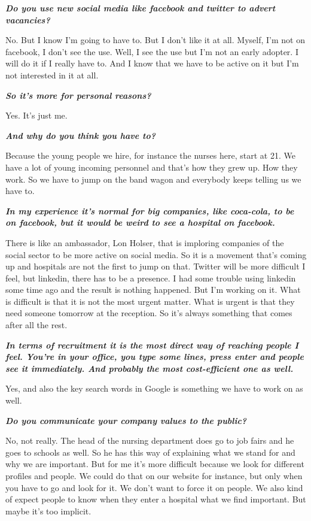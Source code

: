 \documentclass[a4paper,fleqn,11pt,dvips,titlepage]{article}
\newcommand{\question}[1]{\textbf{\textit{#1}}}
\numberwithin{figure}{section}
\numberwithin{equation}{section}
\begin{document}
\question{Do you use new social media like facebook and twitter to advert vacancies?}

No. But I know I’m going to have to. But I don’t like it at all. Myself, I’m not on facebook, I don’t see the use. Well, I see the use but I’m not an early adopter. I will do it if I really have to. And I know that we have to be active on it but I’m not interested in it at all. 

\question{So it’s more for personal reasons?}

Yes. It’s just me. 

\question{And why do you think you have to?}

Because the young people we hire, for instance the nurses here, start at 21. We have a lot of young incoming personnel and that’s how they grew up. How they work.  So we have to jump on the band wagon and everybody keeps telling us we have to. 

\question{In my experience it’s normal for big companies, like coca-cola, to be on facebook, but it would be weird to see a hospital on facebook.}

There is like an ambassador, Lon Holser, that is imploring companies of the social sector to be more active on social media. So it is a movement that’s coming up and hospitals are not the first to jump on that. Twitter will be more difficult I feel, but linkedin, there has to be a presence. I had some trouble using linkedin some time ago and the result is nothing happened. But I’m working on it. What is difficult is that it is not the most urgent matter. What is urgent is that they need someone tomorrow at the reception. So it’s always something that comes after all the rest. 

\question{In terms of recruitment it is the most direct way of reaching people I feel. You’re in your office, you type some lines, press enter and people see it immediately. And probably the most cost-efficient one as well.}

Yes, and also the key search words in Google is something we have to work on as well. 

\question{Do you communicate your company values to the public?}

No, not really. The head of the nursing department does go to job fairs and he goes to schools as well. So he has this way of explaining what we stand for and why we are important. But for me it’s more difficult because we look for different profiles and people. We could do that on our website for instance, but only when you have to go and look for it. We don’t want to force it on people. We also kind of expect people to know when they enter a hospital what we find important. But maybe it’s too implicit. 
\end{document}
